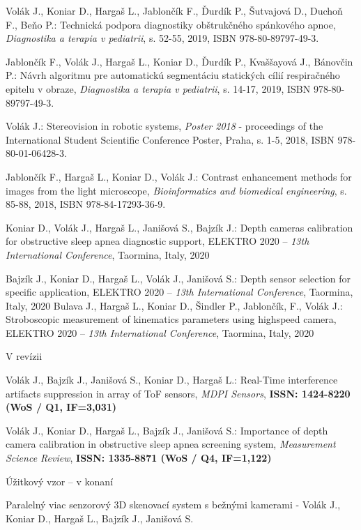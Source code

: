 \noindent Volák J., Koniar D., Hargaš L., Jablončík F., Ďurdík P., Šutvajová D., Duchoň F., Beňo P.: Technická podpora diagnostiky obštrukčného spánkového apnoe, \textit{Diagnostika a terapia v pediatrii}, s. 52-55, 2019, ISBN 978-80-89797-49-3. \newline

\noindent Jablončík F., Volák J., Hargaš L., Koniar D., Ďurdík P., Kvaššayová J., Bánovčin P.: Návrh algoritmu pre automatickú segmentáciu statických cílií respiračného epitelu v obraze, \textit{Diagnostika a terapia v pediatrii}, s. 14-17, 2019, ISBN 978-80-89797-49-3. \newline

\noindent Volák J.: Stereovision in robotic systems, \textit{Poster 2018} - proceedings of the International Student Scientific Conference Poster, Praha, s. 1-5, 2018, ISBN 978-80-01-06428-3. \newline

\noindent Jablončík F., Hargaš L., Koniar D., Volák J.: Contrast enhancement methods for images from the light microscope,\textit{ Bioinformatics and biomedical engineering}, s. 85-88, 2018, ISBN 978-84-17293-36-9. \newline

\noindent Koniar D., Volák J., Hargaš L., Janišová S., Bajzík J.: Depth cameras calibration for obstructive sleep apnea diagnostic support, ELEKTRO 2020 – \textit{13th International Conference}, Taormina, Italy, 2020 \newline

\noindent Bajzík J., Koniar D., Hargaš L., Volák J., Janišová S.: Depth sensor selection for specific application, ELEKTRO 2020 – \textit{13th International Conference}, Taormina, Italy, 2020 
\newpage
\noindent Bulava J., Hargaš L., Koniar D., Šindler P., Jablončík, F., Volák J.: Stroboscopic measurement of kinematics parameters using highspeed camera, ELEKTRO 2020 – \textit{13th International Conference}, Taormina, Italy, 2020 \newline

\begin{center}
	\LARGE V revízii 
\end{center}

\noindent Volák J., Bajzík J., Janišová S., Koniar D., Hargaš L.: Real-Time interference artifacts suppression in array of ToF sensors, \textit{MDPI Sensors}, \textbf{ISSN: 1424-8220 (WoS / Q1, IF=3,031)} \newline

\noindent Volák J., Koniar D., Hargaš L., Bajzík J., Janišová S.: Importance of depth camera calibration in obstructive sleep apnea screening system, \textit{Measurement Science Review}, \textbf{ISSN: 1335-8871 (WoS / Q4, IF=1,122)} \newline

\begin{center}
	\LARGE Úžitkový vzor – v konaní
\end{center}

\noindent Paralelný viac senzorový 3D skenovací system s bežnými kamerami - Volák J., Koniar D., Hargaš L., Bajzík J., Janišová S. \newline